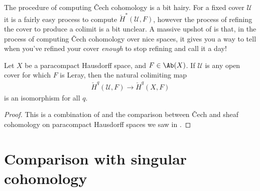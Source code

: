 \documentclass[11pt]{book}
\begin{document}
The procedure of computing \v{C}ech cohomology is a bit hairy. For a fixed cover $\mathcal{U}$ it is a fairly easy process to compute $\check{H}^\ast(\mathcal{U},F)$, however the process of refining the cover to produce a colimit is a bit unclear. A massive upshot of  is that, in the process of computing \v{C}ech cohomology over nice spaces, it gives you a way to tell when you've refined your cover \emph{enough} to stop refining and call it a day!

\begin{corollary}\label{cor:leray-covers-paracompact-spaces} Let $X$ be a paracompact Hausdorff space, and $F\in \Ab(X)$. If $\mathcal{U}$ is any open cover for which $F$ is Leray, then the natural colimiting map
\begin{align*}
    \check{H}^q(\mathcal{U},F) \to \check{H}^q(X,F)
\end{align*}
is an isomorphism for all $q$.
\end{corollary}
\begin{proof} This is a combination of  and the comparison between \v{C}ech and sheaf cohomology on paracompact Hausdorff spaces we saw in .
\end{proof}

\section{Comparison with singular cohomology}
\end{document}
